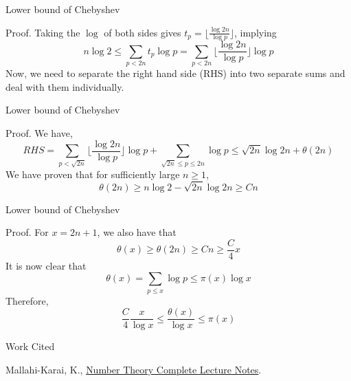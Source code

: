 \documentclass[18pt]{beamer}
\begin{document}
\begin{frame}{Lower bound of Chebyshev}
    \begin{block}{Proof.}
        Taking the $\log{}$ of both sides gives $t_p = \Bigr\lfloor\frac{\log{2n}}{\log{p}}\Bigr\rfloor$, implying
        \[n\log{2} \leq \sum\limits_{p < 2n} t_p \log{p} = \sum\limits_{p < 2n} \Bigr\lfloor\frac{\log{2n}}{\log{p}}\Bigr\rfloor \log{p}\]
        \pause{}
        Now, we need to separate the right hand side (RHS) into two separate sums and deal with them individually.
    \end{block}
\end{frame}

\begin{frame}{Lower bound of Chebyshev}
    \begin{block}{Proof.}
        We have,
        \[RHS = \sum\limits_{p < \sqrt{2n}} \Bigr\lfloor\frac{\log{2n}}{\log{p}} \Bigr\rfloor \log{p} + \sum\limits_{\sqrt{2n} \leq p \leq 2n} \log{p} \leq \sqrt{2n}\log{2n} + \theta(2n)\]
        \pause{}
        We have proven that for sufficiently large $n \geq 1$,
        \[\theta(2n) \geq n\log{2} - \sqrt{2n}\log{2n} \geq Cn\]
    \end{block}
\end{frame}

\begin{frame}{Lower bound of Chebyshev}
    \begin{block}{Proof.}
        For $x = 2n + 1$, we also have that
        \[\theta(x) \geq \theta(2n) \geq Cn \geq \frac{C}{4}x\]
        \pause{}
        It is now clear that
        \[\theta(x) = \sum\limits_{p \leq x} \log{p} \leq \pi(x) \log{x}\]
        \pause{}
        Therefore,
        \[\frac{C}{4}\frac{x}{\log{x}} \leq \frac{\theta(x)}{\log{x}} \leq \pi(x)\]
    \end{block}
\end{frame}

\begin{frame}{Work Cited}
    \begin{thebibliography}{1}
         Mallahi-Karai, K., \href{https://www.dropbox.com/s/msf4auc05s0d1kl/LN-complete_ENT20.pdf?dl=0}{Number Theory Complete Lecture Notes}.
    \end{thebibliography} 
\end{frame}
\end{document}
